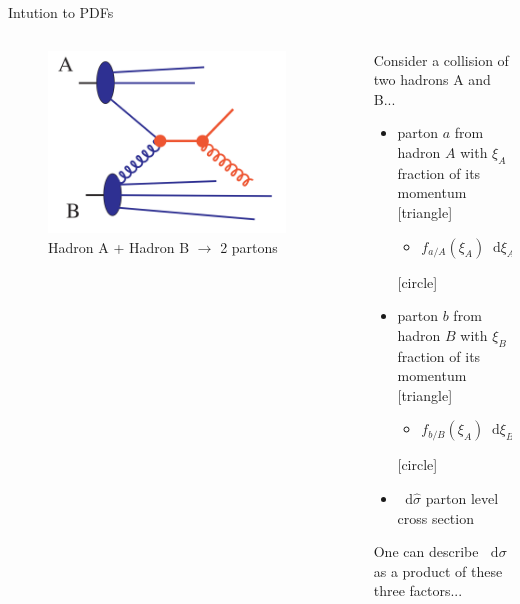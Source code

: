 \documentclass[aspectratio=169,xcolor=dvipsnames]{beamer}
\newcommand*\dif{\mathop{}\!\mathrm{d}}
\begin{document}
\begin{frame}{Intution to PDFs}
	  \begin{columns}[T]
		\begin{column}{.5\textwidth}
				\centering
				\begin{figure}
					\includegraphics[width=0.9\textwidth]{parton.png}
					\caption{Hadron A + Hadron B $\to$ 2 partons}
				\end{figure}
		\end{column}
		\centering 
		\begin{column}{.45\textwidth}
			Consider a collision of two hadrons A and B... \vskip0.1in
			\begin{itemize}
				\item parton $a$ from hadron $A$ with $\xi_A$ fraction of its momentum
				\vskip0.05in
				[triangle]
				\begin{itemize}
					\item $f_{a/A}(\xi_A)\dif \xi_A$
				\end{itemize}\vskip0.075in
				[circle]
				\item parton $b$ from hadron $B$ with $\xi_B$ fraction of its momentum
				\vskip0.05in
				[triangle]
				\begin{itemize}
					\item $f_{b/B}(\xi_A)\dif \xi_B$
				\end{itemize}\vskip0.075in
				[circle]
				\item \alert{$\dif \hat{\sigma}$} parton level cross section
			\end{itemize}\vskip0.1in
			One can describe $\dif \sigma$ as a product of these three factors...
		\end{column}
	\end{columns}
\end{frame}
\end{document}
